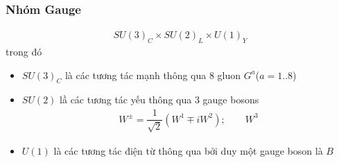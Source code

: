 \documentclass{report}
\newcommand{\f}[2]{\dfrac{#1}{#2}}
\begin{document}
\subsubsection*{Nhóm Gauge}
\begin{align*}
	SU(3)_{C} \times SU(2)_{L} \times U(1)_{Y} 
\end{align*}
trong đó
\begin{itemize}
	\item $SU(3)_{C}$ là các tương tác mạnh thông qua 8 gluon $G^{a}$($a = 1..8$)
	\item $SU(2)$ lầ các tương tác yếu thông qua 3 gauge bosons
	\begin{align*}
		W^{\pm} = \f{1}{\sqrt{2}} (W^{1} \mp i W^{2}) ; \quad \quad W^{3}
	\end{align*}
	\item $U(1)$ là các tương tác điện từ thông qua bởi duy một gauge boson là $B$
\end{itemize}
\end{document}
